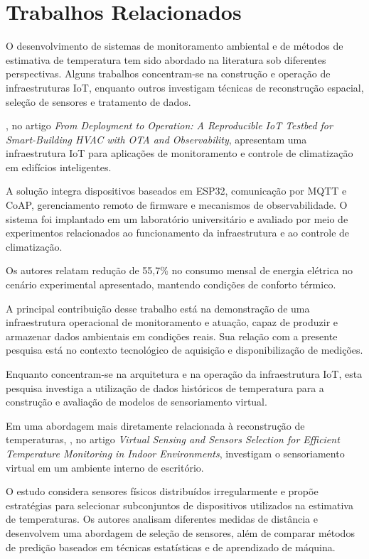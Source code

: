 \section{Trabalhos Relacionados}
\label{sec:trabalhos_relacionados}

O desenvolvimento de sistemas de monitoramento ambiental e de métodos de estimativa de temperatura tem sido abordado na literatura sob diferentes perspectivas. Alguns trabalhos concentram-se na construção e operação de infraestruturas IoT, enquanto outros investigam técnicas de reconstrução espacial, seleção de sensores e tratamento de dados.

, no artigo \textit{From Deployment to Operation: A Reproducible IoT Testbed for Smart-Building HVAC with OTA and Observability}, apresentam uma infraestrutura IoT para aplicações de monitoramento e controle de climatização em edifícios inteligentes.

A solução integra dispositivos baseados em ESP32, comunicação por MQTT e CoAP, gerenciamento remoto de firmware e mecanismos de observabilidade. O sistema foi implantado em um laboratório universitário e avaliado por meio de experimentos relacionados ao funcionamento da infraestrutura e ao controle de climatização.

Os autores relatam redução de 55,7\% no consumo mensal de energia elétrica no cenário experimental apresentado, mantendo condições de conforto térmico.

A principal contribuição desse trabalho está na demonstração de uma infraestrutura operacional de monitoramento e atuação, capaz de produzir e armazenar dados ambientais em condições reais. Sua relação com a presente pesquisa está no contexto tecnológico de aquisição e disponibilização de medições.

Enquanto  concentram-se na arquitetura e na operação da infraestrutura IoT, esta pesquisa investiga a utilização de dados históricos de temperatura para a construção e avaliação de modelos de sensoriamento virtual.

Em uma abordagem mais diretamente relacionada à reconstrução de temperaturas, , no artigo \textit{Virtual Sensing and Sensors Selection for Efficient Temperature Monitoring in Indoor Environments}, investigam o sensoriamento virtual em um ambiente interno de escritório.

O estudo considera sensores físicos distribuídos irregularmente e propõe estratégias para selecionar subconjuntos de dispositivos utilizados na estimativa de temperaturas. Os autores analisam diferentes medidas de distância e desenvolvem uma abordagem de seleção de sensores, além de comparar métodos de predição baseados em técnicas estatísticas e de aprendizado de máquina.

